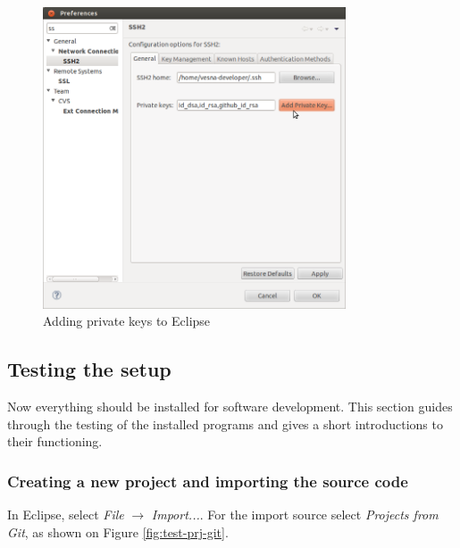 \documentclass[a4paper, 10pt]{article}
\begin{document}
    \begin{figure}[H]
    \centering
        \includegraphics[width=0.8\textwidth]{./install-guide-linux-images/auth-add-key.png}
        \caption{Adding private keys to Eclipse}
        \label{fig:auth-add-key}
    \end{figure}

\subsection{Testing the setup}


Now everything should be installed for software development.
This section guides through the testing of the installed programs
and gives a short introductions to their functioning.

\subsubsection{Creating a new project and importing the source code}

In Eclipse, select \emph{File} $\rightarrow$ \emph{Import...}.
For the import source select \emph{Projects from Git}, as shown on
Figure \ref{fig:test-prj-git}.
\end{document}
